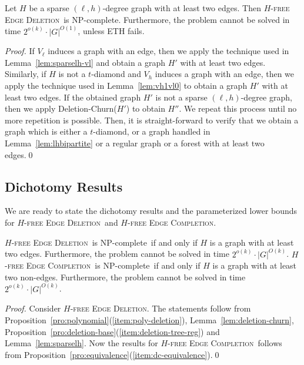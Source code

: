 \documentclass[envcountsame,envcountsect,10pt,oribibl]{llncs}
\newcommand{\pname}[1]{\textnormal{\textsc{#1}}}
\newcommand{\cclass}[1]{\textnormal{\textsf{#1}}}
\newcommand{\HED}{\pname{$H$-free Edge Deletion}}
\newcommand{\HEC}{\pname{$H$-free Edge Completion}}
\newcommand{\HDED}{\pname{$H'$-free Edge Deletion}}
\newcommand{\NPC}{\cclass{NP-complete}}
\begin{document}
\begin{lemma}
  \label{lem:sparselh}
  Let $H$ be a sparse $(\ell,h)$-degree graph with at least two edges.
  Then \HED\ is \NPC. Furthermore, the problem cannot be solved in time
  $2^{o(k)}\cdot |G|^{O(1)}$, unless ETH fails.
\end{lemma}
\begin{proof}
  If $V_{\ell}$ induces a graph with an edge, then we apply
  the technique used in Lemma~\ref{lem:sparselh-vl} and obtain
  a graph $H'$ with at least two edges. Similarly, if $H$ is 
  not a $t$-diamond and $V_h$ induces a graph with an edge,
  then we apply the technique used in Lemma~\ref{lem:vh1vl0} to obtain
  a graph $H'$ with at least two edges. If the obtained graph $H'$
  is not a sparse $(\ell,h)$-degree graph, then we apply 
  Deletion-Churn($H'$) to obtain $H''$. We repeat this process until no more
  repetition is possible. Then, it is straight-forward to verify that
  we obtain a graph which is either a $t$-diamond, or a graph handled in Lemma~\ref{lem:lhbipartite} or
  a regular graph or a forest with at least two edges.\qed
\end{proof}
\begin{comment}
We observe that in all the four cases, we either give a direct reduction and prove 
that the problem is \NPC\ or give a reduction from \HDED\ where $H'$ is a 
graph with at least two edges and has less number of vertices compared to $H$.

\begin{theorem}
  \label{thm:}
  Let $H$ be a sparse $(\ell,h)$-graph with at least two edges.
  Then \HED\ is \NPC. Furthermore, the problem cannot be solved 
  in time $2^{o(k)}\cdot |G|^{O(1)}$, unless ETH fails.
\end{theorem}
\end{comment}
\subsection{Dichotomy Results}

We are ready to state the dichotomy results and the 
parameterized lower bounds for \HED\ and \HEC.

\begin{theorem}
  \label{thm:final}
  \HED\ is \NPC\ if and only if $H$ is a graph with at least two edges.
  Furthermore, the problem cannot be solved in time $2^{o(k)}\cdot |G|^{O(k)}$.
  \HEC\ is \NPC\ if and only if $H$ is a graph with at least two non-edges.
  Furthermore, the problem cannot be solved in time $2^{o(k)}\cdot |G|^{O(k)}$.
\end{theorem}
\begin{proof}
  Consider \HED. The statements follow from 
  Proposition~\ref{pro:polynomial}(\ref{item:poly-deletion}), Lemma~\ref{lem:deletion-churn}, 
  Proposition~\ref{pro:deletion-base}(\ref{item:deletion-tree-reg}) and Lemma~\ref{lem:sparselh}.
  Now the results for \HEC\ follows from Proposition~\ref{pro:equivalence}(\ref{item:dc-equivalence}).\qed
\end{proof}
\end{document}
